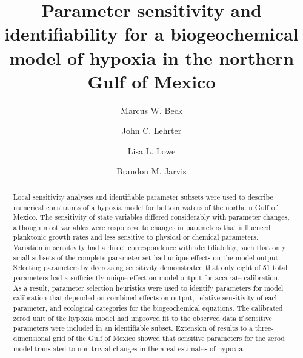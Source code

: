 \documentclass[review]{elsarticle}\usepackage[]{graphicx}\usepackage[]{color}
\begin{document}
\large

\begin{frontmatter}

\title{Parameter sensitivity and identifiability for a biogeochemical model of hypoxia in the northern {G}ulf of {M}exico}

\date{}

\author{Marcus W. Beck}
\address{USEPA National Health and Environmental Effects Research Laboratory, Gulf Ecology Division, 1 Sabine Island Drive, Gulf Breeze, FL 32561}

\author{John C. Lehrter}
\address{University of South Alabama, Dauphin Island Sea Lab, Dauphin Island, AL 36528}

\author{Lisa L. Lowe}
\address{CSRA, Inc. supporting the USEPA, Research Triangle Park, NC 27709}

\author{Brandon M. Jarvis}
\address{USEPA National Health and Environmental Effects Research Laboratory, Gulf Ecology Division, 1 Sabine Island Drive, Gulf Breeze, FL 32561}



\begin{abstract}
\noindent Local sensitivity analyses and identifiable parameter subsets were used to describe numerical constraints of a hypoxia model for bottom waters of the northern Gulf of Mexico.  The sensitivity of state variables differed considerably with parameter changes, although most variables were responsive to changes in parameters that influenced planktonic growth rates and less sensitive to physical or chemical parameters.  Variation in sensitivity had a direct correspondence with identifiability, such that only small subsets of the complete parameter set had unique effects on the model output. Selecting parameters by decreasing sensitivity demonstrated that only eight of 51 total parameters had a sufficiently unique effect on model output for accurate calibration.  As a result, parameter selection heuristics were used to identify parameters for model calibration that depended on combined effects on output, relative sensitivity of each parameter, and ecological categories for the biogeochemical equations. The calibrated \ac{zerod} unit of the hypoxia model had improved fit to the observed data if sensitive parameters were included in an identifiable subset.  Extension of results to a three-dimensional grid of the Gulf of Mexico showed that sensitive parameters for the \ac{zerod} model translated to non-trivial changes in the areal estimates of hypoxia.
\end{abstract}


\end{frontmatter}
\end{document}
